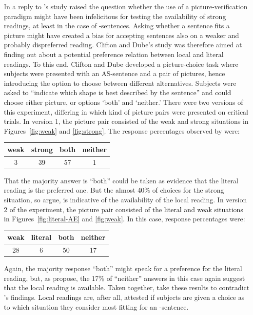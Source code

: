 \documentclass[fleqn,reqno,10pt,draft]{article}
\newcommand{\as}{\acro{as}}
\begin{document}
In a reply to \citeauthor{GeurtsPouscoulous2009:Embedded-Implic}'s
study \citeauthor{CliftonDube2010:Embedded-Implic} raised the question
whether the use of a picture-verification paradigm might have been
infelicitous for testing the availability of strong readings, at least
in the case of \as-sentences. Asking whether a sentence fits a picture
might have created a bias for accepting sentences also on a weaker and
probably dispreferred reading. Clifton and Dube's study was therefore
aimed at finding out about a potential preference relation between
local and literal readings. To this end, Clifton and Dube developed a
picture-choice task where subjects were presented with an AS-sentence
and a pair of pictures, hence introducing the option to choose between
different alternatives. Subjects were asked to ``indicate which shape
is best described by the sentence'' and could choose either picture,
or options `both' and `neither.' There were two versions of this
experiment, differing in which kind of picture pairs were presented on
critical trials. In version 1, the picture pair consisted of the weak
and strong situations in Figures~\ref{fig:weak} and
\ref{fig:strong}. The response percentages observed by
\citeauthor{CliftonDube2010:Embedded-Implic} were:

\begin{center}
  \begin{tabular}{cccc}
    weak & strong & both & neither
    \\ \midrule 
 3 & 39 & 57 & 1 
  \end{tabular}
\end{center}

\noindent That the majority answer is ``both'' could be taken as
evidence that the literal reading is the preferred one. But the almost
40\% of choices for the strong situation, so
\citeauthor{CliftonDube2010:Embedded-Implic} argue, is indicative of
the availability of the local reading. In version 2 of the experiment,
the picture pair consisted of the literal and weak situations in
Figures~\ref{fig:literal-AE} and \ref{fig:weak}. In this case,
response percentages were:

\begin{center}
  \begin{tabular}{cccc}
    weak & literal & both & neither
    \\ \midrule 
    28 & 6 & 50 & 17 
  \end{tabular}
\end{center}

\noindent Again, the majority response ``both'' might speak for a
preference for the literal reading, but, as
\citeauthor{CliftonDube2010:Embedded-Implic} propose, the 17\% of
``neither'' answers in this case again suggest that the local reading
is available. Taken together,
\citeauthor{CliftonDube2010:Embedded-Implic} take these results to
contradict \citeauthor{GeurtsPouscoulous2009:Embedded-Implic}'s
findings. Local readings are, after all, attested if subjects are
given a choice as to which situation they consider most fitting for an
\as-sentence.
\end{document}
